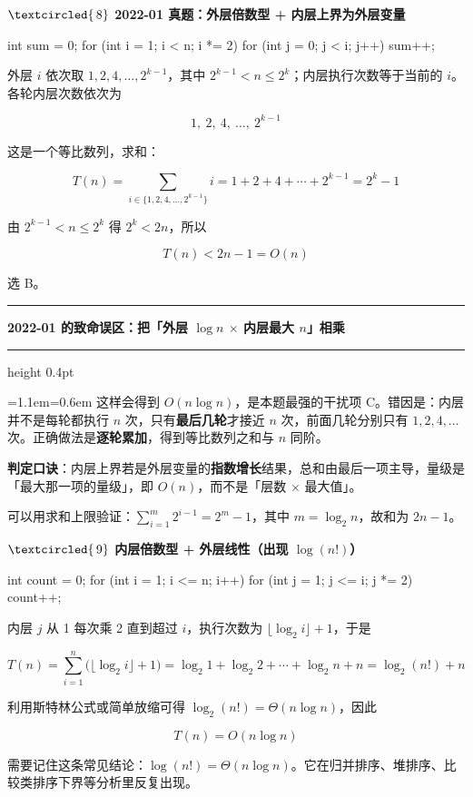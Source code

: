 \documentclass[11pt,openany,UTF8]{ctexbook}
\newcommand{\circled}[1]{\textcircled{\scriptsize\,#1}}
\newcommand{\callouthead}[2]{%
  \par\addvspace{7pt}\noindent
  {\color{#1}\rule[-0.15em]{3pt}{1.05em}}\hspace{0.5em}%
  {\bfseries\color{#1}#2}\par\nobreak\vspace{-0.35em}%
  {\color{rulesep}\hrule height 0.4pt}\nobreak\vspace{0.45em}%
  \begingroup\small\setlength{\parindent}{0pt}%
  \leftskip=1.1em\rightskip=0.6em\noindent\ignorespaces}
\newcommand{\calloutend}{\par\endgroup\addvspace{7pt}}
\newenvironment{callwarn}[1]{\callouthead{warnbar}{#1}}{\calloutend}
\begin{document}
\textbf{$\circled{8}$ 2022-01 真题：外层倍数型 + 内层上界为外层变量}

\begin{codebox}
int sum = 0;
for (int i = 1; i < n; i *= 2)
    for (int j = 0; j < i; j++)
        sum++;
\end{codebox}

外层 $i$ 依次取 $1,2,4,\dots,2^{k-1}$，其中 $2^{k-1} < n \le 2^k$；内层执行次数等于当前的 $i$。各轮内层次数依次为

\[1,\ 2,\ 4,\ \dots,\ 2^{k-1}\]

这是一个等比数列，求和：

\[T(n)=\sum_{i\in\{1,2,4,\dots,2^{k-1}\}} i = 1+2+4+\cdots+2^{k-1}=2^{k}-1\]

由 $2^{k-1} < n \le 2^k$ 得 $2^k < 2n$，所以

\[T(n) < 2n - 1 = O(n)\]

选 B。

\begin{callwarn}{2022-01 的致命误区：把「外层 $\log n$ $\times$ 内层最大 $n$」相乘}
这样会得到 $O(n\log n)$，是本题最强的干扰项 C。错因是：内层并不是每轮都执行 $n$ 次，只有\textbf{最后几轮}才接近 $n$ 次，前面几轮分别只有 $1,2,4,\dots$ 次。正确做法是\textbf{逐轮累加}，得到等比数列之和与 $n$ 同阶。

\textbf{判定口诀}：内层上界若是外层变量的\textbf{指数增长}结果，总和由最后一项主导，量级是「最大那一项的量级」，即 $O(n)$，而不是「层数 $\times$ 最大值」。

可以用求和上限验证：$\sum_{i=1}^{m} 2^{i-1} = 2^m-1$，其中 $m=\log_2 n$，故和为 $2n-1$。

\end{callwarn}

\textbf{$\circled{9}$ 内层倍数型 + 外层线性（出现 $\log(n!)$）}

\begin{codebox}
int count = 0;
for (int i = 1; i <= n; i++)
    for (int j = 1; j <= i; j *= 2)
        count++;
\end{codebox}

内层 $j$ 从 1 每次乘 2 直到超过 $i$，执行次数为 $\lfloor\log_2 i\rfloor+1$，于是

\[T(n)=\sum_{i=1}^{n}\big(\lfloor\log_2 i\rfloor+1\big)=\log_2 1+\log_2 2+\cdots+\log_2 n+n=\log_2(n!)+n\]

利用斯特林公式或简单放缩可得 $\log_2(n!)=\Theta(n\log n)$，因此

\[T(n)=O(n\log n)\]

需要记住这条常见结论：$\log(n!) = \Theta(n\log n)$。它在归并排序、堆排序、比较类排序下界等分析里反复出现。
\end{document}
